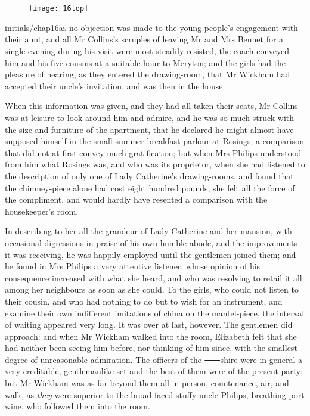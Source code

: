 \chapter[Chapter \thechapter]{}
	
	\begin{figure}[t!]
\centering
\texttt{[image: 16top]}
\end{figure}

\lettrine[lines=6,image=true,loversize=.18]{initials/chap16a}{s}  no objection was made to the young people's engagement with their aunt, and all Mr Collins's scruples of leaving Mr and Mrs Bennet for a single evening during his visit were most steadily resisted, the coach conveyed him and his five cousins at a suitable hour to Meryton; and the girls had the pleasure of hearing, as they entered the drawing-room, that Mr Wickham had accepted their uncle's invitation, and was then in the house.

When this information was given, and they had all taken their seats, Mr Collins was at leisure to look around him and admire, and he was so much struck with the size and furniture of the apartment, that he declared he might almost have supposed himself in the small summer breakfast parlour at Rosings; a comparison that did not at first convey much gratification; but when Mrs Philips understood from him what Rosings was, and who was its proprietor, when she had listened to the description of only one of Lady Catherine's drawing-rooms, and found that the chimney-piece alone had cost eight hundred pounds, she felt all the force of the compliment, and would hardly have resented a comparison with the housekeeper's room.



In describing to her all the grandeur of Lady Catherine and her mansion, with occasional digressions in praise of his own humble abode, and the improvements it was receiving, he was happily employed until the gentlemen joined them; and he found in Mrs Philips a very attentive listener, whose opinion of his consequence increased with what she heard, and who was resolving to retail it all among her neighbours as soon as she could. To the girls, who could not listen to their cousin, and who had nothing to do but to wish for an instrument, and examine their own indifferent imitations of china on the mantel-piece, the interval of waiting appeared very long. It was over at last, however. The gentlemen did approach: and when Mr Wickham walked into the room, Elizabeth felt that she had neither been seeing him before, nor thinking of him since, with the smallest degree of unreasonable admiration. The officers of the ⸺shire were in general a very creditable, gentlemanlike set and the best of them were of the present party; but Mr Wickham was as far beyond them all in person, countenance, air, and walk, as \textit{they} were superior to the broad-faced stuffy uncle Philips, breathing port wine, who followed them into the room.

